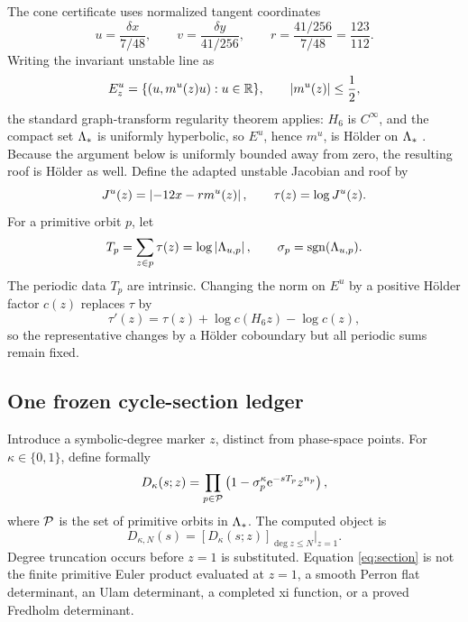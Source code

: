 The cone certificate uses normalized tangent coordinates
\[
 u=\frac{\delta x}{7/48},\qquad
 v=\frac{\delta y}{41/256},\qquad
 r=\frac{41/256}{7/48}=\frac{123}{112}.
\]
Writing the invariant unstable line as
\[
 E_z^u=\{(u,m^u(z)u):u\in\mathbb{R}\},\qquad \left|m^u(z)\right|\le\frac12,
\]
the standard graph-transform regularity theorem applies: \(H_6\) is
\(C^\infty\), and the compact set \(\Lambda_*\) is uniformly hyperbolic, so
\(E^u\), hence \(m^u\), is H\"older on \(\Lambda_*\)
\citep{Hasselblatt1994}.  Because the argument below is uniformly bounded
away from zero, the resulting roof is H\"older as well.  Define the adapted
unstable Jacobian and roof by
\begin{equation}
 J^u(z)=\left|-12x-rm^u(z)\right|,\qquad
 \tau(z)=\log J^u(z).
 \label{eq:roof}
\end{equation}
For a primitive orbit \(p\), let
\[
 T_p=\sum_{z\in p}\tau(z)=\log\left|\Lambda_{u,p}\right|,
 \qquad
 \sigma_p=\operatorname{sgn}(\Lambda_{u,p}).
\]
The periodic data \(T_p\) are intrinsic.  Changing the norm on \(E^u\) by a
positive H\"older factor \(c(z)\) replaces \(\tau\) by
\[
 \tau'(z)=\tau(z)+\log c(H_6z)-\log c(z),
\]
so the representative changes by a H\"older coboundary but all periodic sums
remain fixed.

\subsection{One frozen cycle-section ledger}

Introduce a symbolic-degree marker \(z\), distinct from phase-space points.
For \(\kappa\in\{0,1\}\), define formally
\begin{equation}
 D_\kappa(s;z)=
 \prod_{p\in\mathcal{P}}
 \left(1-\sigma_p^\kappa \mathrm{e}^{-sT_p}z^{n_p}\right),
 \label{eq:two-variable}
\end{equation}
where \(\mathcal{P}\) is the set of primitive orbits in \(\Lambda_*\).  The computed object
is
\begin{equation}
 D_{\kappa,N}(s)=
 \left[D_\kappa(s;z)\right]_{\deg z\le N}\big|_{z=1}.
 \label{eq:section}
\end{equation}
Degree truncation occurs before \(z=1\) is substituted.  Equation
\eqref{eq:section} is not the finite primitive Euler product evaluated at
\(z=1\), a smooth Perron flat determinant, an Ulam determinant, a completed
xi function, or a proved Fredholm determinant.
